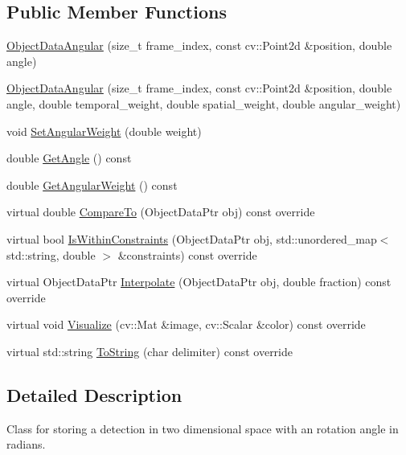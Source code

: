 \subsection*{Public Member Functions}
\begin{DoxyCompactItemize}
\item 
\hyperlink{classcore_1_1ObjectDataAngular_a276b02fc7646e3275f1cb81fca7e9a47}{Object\+Data\+Angular} (size\+\_\+t frame\+\_\+index, const cv\+::\+Point2d \&position, double angle)
\item 
\hyperlink{classcore_1_1ObjectDataAngular_aae3a8f335e26771d06c8940931d5d654}{Object\+Data\+Angular} (size\+\_\+t frame\+\_\+index, const cv\+::\+Point2d \&position, double angle, double temporal\+\_\+weight, double spatial\+\_\+weight, double angular\+\_\+weight)
\item 
void \hyperlink{classcore_1_1ObjectDataAngular_af6772caef2337f3c12a3f52049c4d853}{Set\+Angular\+Weight} (double weight)
\item 
double \hyperlink{classcore_1_1ObjectDataAngular_a6c2da5010cd919af3b0f156579d04ef8}{Get\+Angle} () const
\item 
double \hyperlink{classcore_1_1ObjectDataAngular_ae1c5db7b9fc06e648450d9388c93a1aa}{Get\+Angular\+Weight} () const
\item 
virtual double \hyperlink{classcore_1_1ObjectDataAngular_a2932240c6c082b76f2c04723cdf3e4f9}{Compare\+To} (Object\+Data\+Ptr obj) const override
\item 
virtual bool \hyperlink{classcore_1_1ObjectDataAngular_a1ef9168c2384d2038a1dd6e85d0b932f}{Is\+Within\+Constraints} (Object\+Data\+Ptr obj, std\+::unordered\+\_\+map$<$ std\+::string, double $>$ \&constraints) const override
\item 
virtual Object\+Data\+Ptr \hyperlink{classcore_1_1ObjectDataAngular_a42962dd1f994b2577133450e755d586e}{Interpolate} (Object\+Data\+Ptr obj, double fraction) const override
\item 
virtual void \hyperlink{classcore_1_1ObjectDataAngular_acb4265f6de511238460df118148bc85c}{Visualize} (cv\+::\+Mat \&image, cv\+::\+Scalar \&color) const override
\item 
virtual std\+::string \hyperlink{classcore_1_1ObjectDataAngular_a3b419c1d4be886f094b9af94cd839bd4}{To\+String} (char delimiter) const override
\end{DoxyCompactItemize}


\subsection{Detailed Description}
Class for storing a detection in two dimensional space with an rotation angle in radians. 

